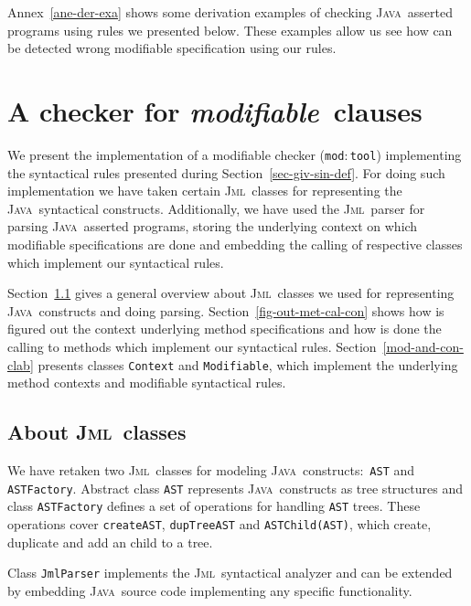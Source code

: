 \documentclass[a4paper]{llncs}
\newcommand{\jml}{\textsc{Jml}}
\newcommand{\java}{\textsc{Java}}
\newcommand{\modtool}{\texttt{mod$:$tool}}
\newcommand{\modif}{\textit{modifiable}}
\begin{document}
Annex~\ref{ane-der-exa} shows some derivation examples of checking
\java~asserted programs using rules we presented below. These examples
allow us see how can be detected wrong modifiable specification using
our rules.






\section{A checker for \modif~clauses}
\label{sec-imp-iss}
We present the implementation of a modifiable checker (\modtool)
implementing the syntactical rules presented during
Section~\ref{sec-giv-sin-def}. For doing such implementation we have
taken certain \jml~classes for representing the \java~syntactical
constructs. Additionally, we have used the \jml~parser for parsing
\java~asserted programs, storing the underlying context on which
modifiable specifications are done and embedding the calling of
respective classes which implement our syntactical rules.

Section~\ref{abo-jml-cla-use} gives a general overview about
\jml~classes we used for representing \java~constructs and doing
parsing. Section~\ref{fig-out-met-cal-con} shows how is figured out the
context underlying method specifications and how is done the calling to
methods which implement our syntactical
rules. Section~\ref{mod-and-con-clab} presents classes
\texttt{Context} and \texttt{Modifiable}, which implement the
underlying method contexts and modifiable syntactical rules.




\subsection{About \jml~classes}
\label{abo-jml-cla-use}
We have retaken two \jml~classes for modeling \java~constructs$:$
\texttt{AST} and \texttt{ASTFactory}. Abstract class \texttt{AST}
represents \java~constructs as tree structures and class
\texttt{ASTFactory} defines a set of operations for handling
\texttt{AST} trees. These operations cover \texttt{create{AST}},
\texttt{dupTree{AST}} and \texttt{ASTChild(AST)}, which create,
duplicate and add an child to a tree.

Class \texttt{JmlParser} implements the \jml~syntactical analyzer and
can be extended by embedding \java~source code implementing any
specific functionality.
\end{document}
